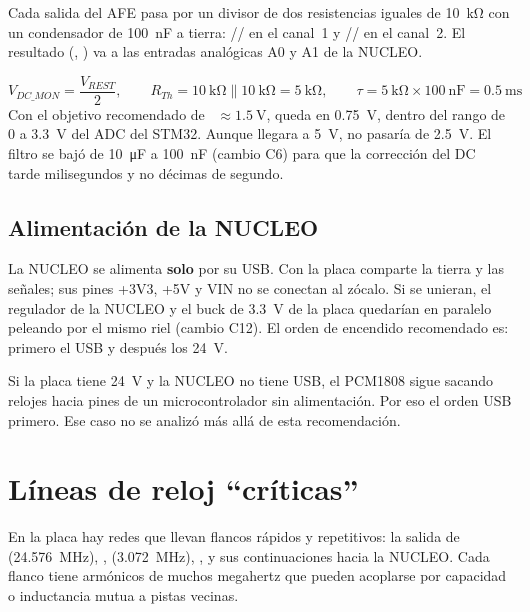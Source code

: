 Cada salida del AFE pasa por un divisor de dos resistencias iguales de \SI{10}{\kilo\ohm} con un condensador de \SI{100}{\nano\farad} a tierra: // en el canal~1 y // en el canal~2. El resultado (, ) va a las entradas analógicas A0 y A1 de la NUCLEO.

\begin{calculo}
\[
V_{DC\_MON}=\frac{V_{REST}}{2},\qquad R_{Th}=\SI{10}{\kilo\ohm}\parallel\SI{10}{\kilo\ohm}=\SI{5}{\kilo\ohm},\qquad \tau=\SI{5}{\kilo\ohm}\times\SI{100}{\nano\farad}=\SI{0.5}{\milli\second}
\]
Con el objetivo recomendado de ~$\approx\SI{1.5}{\volt}$,  queda en \SI{0.75}{\volt}, dentro del rango de 0 a \SI{3.3}{\volt} del ADC del STM32. Aunque  llegara a \SI{5}{\volt},  no pasaría de \SI{2.5}{\volt}. El filtro se bajó de \SI{10}{\micro\farad} a \SI{100}{\nano\farad} (cambio C6) para que la corrección del DC tarde milisegundos y no décimas de segundo.
\end{calculo}

\subsection{Alimentación de la NUCLEO}

La NUCLEO se alimenta \textbf{solo} por su USB. Con la placa comparte la tierra y las señales; sus pines +3V3, +5V y VIN no se conectan al zócalo. Si se unieran, el regulador de la NUCLEO y el buck de \SI{3.3}{\volt} de la placa quedarían en paralelo peleando por el mismo riel (cambio C12). El orden de encendido recomendado es: primero el USB y después los \SI{24}{\volt}.

\begin{ojo}
Si la placa tiene \SI{24}{\volt} y la NUCLEO no tiene USB, el PCM1808 sigue sacando relojes hacia pines de un microcontrolador sin alimentación. Por eso el orden USB primero. Ese caso no se analizó más allá de esta recomendación.
\end{ojo}

\section{Líneas de reloj ``críticas''}\label{sec:c04-reloj-critico}

En la placa hay redes que llevan flancos rápidos y repetitivos: la salida de  (\SI{24.576}{\mega\hertz}), ,  (\SI{3.072}{\mega\hertz}), ,  y sus continuaciones  hacia la NUCLEO. Cada flanco tiene armónicos de muchos megahertz que pueden acoplarse por capacidad o inductancia mutua a pistas vecinas.

